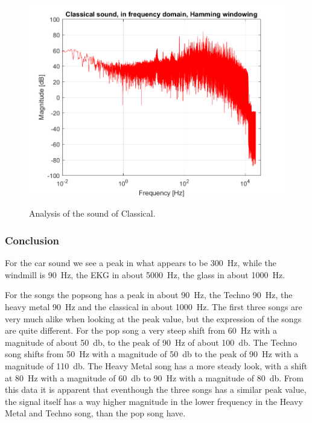 \begin{figure}[htb!]
	{\includegraphics[width=0.45\linewidth]{code/Classical_figure5.png}}
	\caption{Analysis of the sound of Classical.}\label{fig:klassisk}
\end{figure}

\subsubsection{Conclusion}

For the car sound we see a peak in what appears to be \SI{300}{\hertz}, while the windmill is \SI{90}{\hertz}, the EKG in about \SI{5000}{\hertz}, the glass in about \SI{1000}{\hertz}. 

For the songs the popsong has a peak in about \SI{90}{\hertz}, the Techno \SI{90}{\hertz}, the heavy metal \SI{90}{\hertz} and the classical in about \SI{1000}{\hertz}. The first three songs are very much alike when looking at the peak value, but the expression of the songs are quite different. For the pop song a very steep shift from \SI{60}{\hertz} with a magnitude of about \SI{50}{\decibel}, to the peak of \SI{90}{\hertz} of about \SI{100}{\decibel}. The Techno song shifts from \SI{50}{\hertz} with a magnitude of \SI{50}{\decibel} to the peak of \SI{90}{\hertz} with a magnitude of \SI{110}{\decibel}. The Heavy Metal song has a more steady look, with a shift at \SI{80}{\hertz} with a magnitude of \SI{60}{\decibel} to \SI{90}{\hertz} with a magnitude of \SI{80}{\decibel}. From this data it is apparent that eventhough the three songs has a similar peak value, the signal itself has a way higher magnitude in the lower frequency in the Heavy Metal and Techno song, than the pop song have.  


